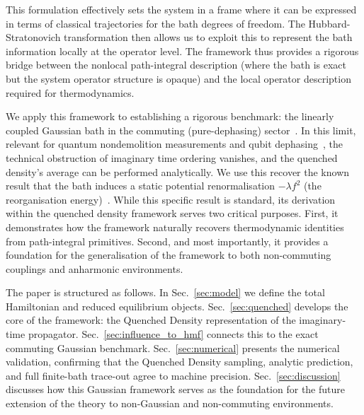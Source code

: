 This formulation effectively sets the system in a frame where it can be expressed in terms of classical trajectories for the bath degrees of freedom. The Hubbard-Stratonovich transformation then allows us to exploit this to represent the bath information locally at the operator level. The framework thus provides a rigorous bridge between the nonlocal path-integral description (where the bath is exact but the system operator structure is opaque) and the local operator description required for thermodynamics.

We apply this framework to establishing a rigorous benchmark: the linearly coupled Gaussian bath in the commuting (pure-dephasing) sector~\cite{clerkIntroductionQuantumNoise2010,breuerTheoryOpenQuantum2002}. In this limit, relevant for quantum nondemolition measurements and qubit dephasing~\cite{makhlinQuantumStateEngineering2001,palmaQuantumComputersDissipation1996}, the technical obstruction of imaginary time ordering vanishes, and the quenched density's average can be performed analytically. We use this recover the known result that the bath induces a static potential renormalisation $-\lambda f^2$ (the reorganisation energy)~\cite{campisiTalknerHanggi2009Solvable}. While this specific result is standard, its derivation within the quenched density framework serves two critical purposes. First, it demonstrates how the framework naturally recovers thermodynamic identities from path-integral primitives. Second, and most importantly, it provides a foundation for the generalisation of the framework to both non-commuting couplings and anharmonic environments.

The paper is structured as follows. In Sec.~\ref{sec:model} we define the total Hamiltonian and reduced equilibrium objects. Sec.~\ref{sec:quenched} develops the core of the framework: the Quenched Density representation of the imaginary-time propagator. Sec.~\ref{sec:influence_to_hmf} connects this to the exact commuting Gaussian benchmark. Sec.~\ref{sec:numerical} presents the numerical validation, confirming that the Quenched Density sampling, analytic prediction, and full finite-bath trace-out agree to machine precision. Sec.~\ref{sec:discussion} discusses how this Gaussian framework serves as the foundation for the future extension of the theory to non-Gaussian and non-commuting environments.
